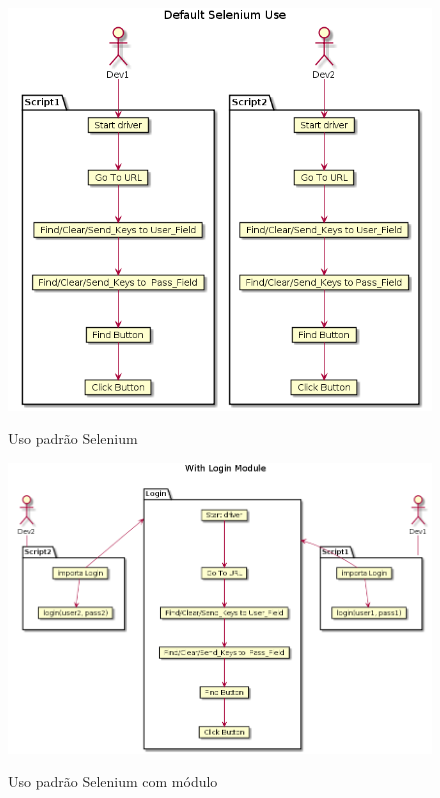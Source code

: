 \begin{apendicesenv}
    \begin{figure}[H]
        \vspace*{0,3cm}
        \centering
        \caption{Uso padrão Selenium}
        \includegraphics[width=1\textwidth]{./04-figuras/page_object_selenium}
        \label{fig:selenium_default}
    \end{figure}

    \begin{figure}[H]
        \vspace*{0,3cm}
        \centering
        \caption{Uso padrão Selenium com módulo}
        \includegraphics[width=1\textwidth]{./04-figuras/page_object_module}
        \label{fig:selenium_module}
    \end{figure}


\end{apendicesenv}
